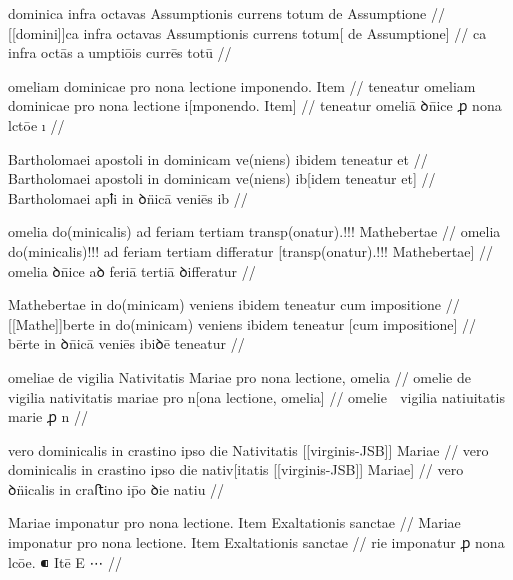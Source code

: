 \ex \bg
\gla
{}
dominica infra octavas Assumptionis currens totum de Assumptione 
//
\glRekonstrukcja
{}
[[domini]]ca infra octavas Assumptionis currens totum[ de Assumptione] 
//
\glU
{}
ca infra octās aumptiōis currēs totū  
//
\endgl
\eg


\ex \bg
\gla
{}
{} omeliam dominicae pro nona lectione imponendo.
Item 
//
\glRekonstrukcja
{}
teneatur   omeliam dominicae pro nona lectione i[mponendo.
Item]
//
\glU
{}
teneatur   omeliā ꝺn̄ice ꝓ nona lctōe ı 
//
\endgl
\eg



\ex \bg
\gla
{}
Bartholomaei apostoli in dominicam ve(niens) ibidem teneatur et 
//
\glRekonstrukcja
{}
Bartholomaei apostoli in dominicam ve(niens) ib[idem teneatur et] 
//
\glU
{}
Bartholomaei apꝉi in ꝺn̈icā veniēs ib  
//
\endgl
\eg



\ex \bg
\gla
{}
omelia do(minicalis) ad feriam tertiam {} transp(onatur).!!!
Mathebertae
//
\glRekonstrukcja
{}
omelia do(minicalis)!!! ad feriam tertiam differatur [transp(onatur).!!!
Mathebertae]
//
\glU
{}
omelia ꝺn̄ice aꝺ feriā tertiā ꝺiﬀeratur  
//
\endgl
\eg



\ex \bg
\gla
{}
Mathebertae in do(minicam) veniens ibidem teneatur  cum impositione
//
\glRekonstrukcja
{}
[[Mathe]]berte in do(minicam) veniens ibidem teneatur  [cum impositione]
//
\glU
{}
bērte in ꝺn̄icā veniēs ibiꝺē teneatur   
//
\endgl
\eg



\ex \bg
\gla
{}
omeliae de vigilia Nativitatis Mariae pro nona lectione, omelia
//
\glRekonstrukcja
{}
omelie de vigilia nativitatis mariae pro n[ona lectione, omelia]
//
\glU
{}
omelie  vigilia natiuitatis marie ꝓ n  
//
\endgl
\eg



\ex \bg
\gla
{}
vero dominicalis in crastino ipso die Nativitatis [[virginis-JSB]] Mariae
//
\glRekonstrukcja
{}
vero dominicalis in crastino ipso die nativ[itatis [[virginis-JSB]] Mariae]
//
\glU
{}
vero ꝺn̈icalis in craﬅino ip̄o ꝺie natiu  
//
\endgl
\eg



\ex \bg
\gla
{}
Mariae imponatur pro
nona lectione.
Item Exaltationis sanctae
//
\glRekonstrukcja
{}
Mariae imponatur pro
nona lectione.
Item Exaltationis sanctae
//
\glU
{}
rie imponatur ꝓ nona lcōe. ⁌ Itē E ⋯
//
\endgl
\eg



